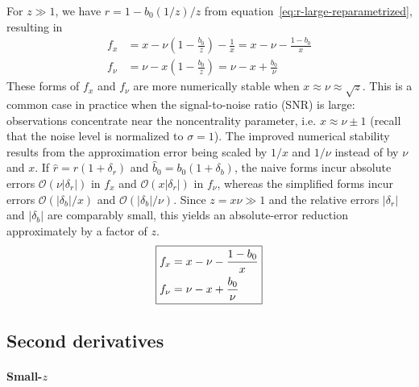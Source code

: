 \documentclass{article}
\begin{document}
For $z \gg 1$, we have $r = 1 - b_0(1/z) / z$ from equation~\eqref{eq:r-large-reparametrized}, resulting in
%
\begin{align}
  f_x   & = x - \nu (1 - \frac{b_0}{z}) - \frac{1}{x}
  = x - \nu - \frac{1 - b_0}{x}                       \\
  f_\nu & = \nu - x (1 - \frac{b_0}{z})
  = \nu - x + \frac{b_0}{\nu}
\end{align}
%
These forms of $f_x$ and $f_\nu$ are more numerically
stable when $x \approx \nu \approx \sqrt{z}$.
This is a common case in practice when the signal-to-noise ratio (SNR) is large: observations concentrate near the noncentrality parameter, i.e. $x \approx \nu \pm 1$ (recall that the noise level is normalized to $\sigma=1$).
The improved numerical stability results from the approximation error being scaled by $1/x$ and $1/\nu$ instead of by $\nu$ and $x$.
If $\hat{r}=r(1+\delta_r)$ and $\hat{b}_0=b_0(1+\delta_b)$, the naive forms incur absolute errors $\mathcal{O}(\nu|\delta_r|)$ in $f_x$ and $\mathcal{O}(x|\delta_r|)$ in $f_\nu$, whereas the simplified forms incur errors $\mathcal{O}(|\delta_b|/x)$ and $\mathcal{O}(|\delta_b|/\nu)$.
Since $z = x\nu \gg 1$ and the relative errors $|\delta_r|$ and $|\delta_b|$ are comparably small, this yields an absolute-error reduction approximately by a factor of $z$.
%
%
\begin{align}\label{eq:first-derivatives-large-z}
  \boxed{%
    \begin{aligned}
      f_x   & = x - \nu - \frac{1 - b_0}{x} \\
      f_\nu & = \nu - x + \frac{b_0}{\nu}
    \end{aligned}}
\end{align}

\subsection{Second derivatives}

\paragraph{Small-$z$}
\end{document}
